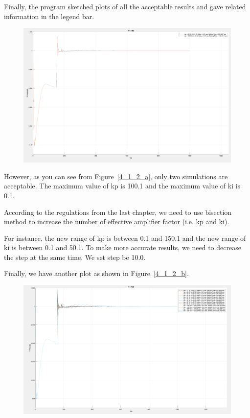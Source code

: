 Finally, the program sketched plots of all the acceptable results and gave related information in the legend bar.\\

\begin{figure}[htbp]
\centering
\includegraphics[width = .819\textwidth]{figure/4_1_2_a.png}
\end{figure}

However, as you can see from Figure~\ref{4_1_2_a}, only two simulations are acceptable. The maximum value of kp is 100.1 and the maximum value of ki is 0.1.  

According to the regulations from the last chapter, we need to use bisection method to increase the number of effective amplifier factor (i.e. kp and ki).

For instance, the new range of kp is between 0.1 and 150.1 and the new range of ki is between 0.1 and 50.1. To make more accurate results, we need to decrease the step at the same time. We set step be 10.0.  

Finally, we have another plot as shown in Figure~\ref{4_1_2_b}.  

\begin{figure}[htbp]
\centering
\includegraphics[width = .819\textwidth]{figure/4_1_2_b.png}
\end{figure}


